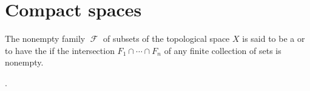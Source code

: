 \section{Compact spaces}\label{sec:compact_spaces}

\begin{definition}\label{def:centered_family}
  The nonempty family \( \mscrF \) of subsets of the topological space \( X \) is said to be a  or to have the  if the intersection \( F_1 \cap \cdots \cap F_n \) of any finite collection of sets is nonempty.
\end{definition}

\begin{definition}\label{def:sequentially_compact_space}
  .
\end{definition}

